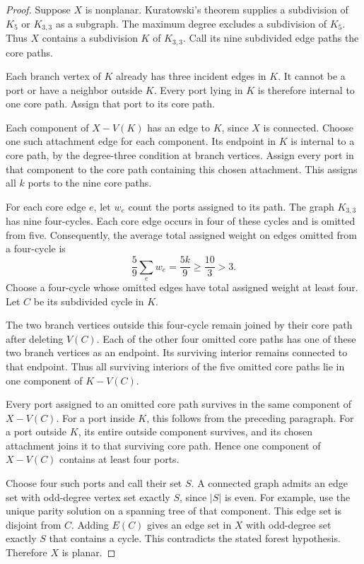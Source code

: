 \begin{proof}
Suppose $X$ is nonplanar.
Kuratowski's theorem supplies a subdivision of $K_5$ or $K_{3,3}$ as a subgraph.
The maximum degree excludes a subdivision of $K_5$.
Thus $X$ contains a subdivision $K$ of $K_{3,3}$.
Call its nine subdivided edge paths the core paths.

Each branch vertex of $K$ already has three incident edges in $K$.
It cannot be a port or have a neighbor outside $K$.
Every port lying in $K$ is therefore internal to one core path.
Assign that port to its core path.

Each component of $X-V(K)$ has an edge to $K$, since $X$ is connected.
Choose one such attachment edge for each component.
Its endpoint in $K$ is internal to a core path, by the degree-three condition at branch vertices.
Assign every port in that component to the core path containing this chosen attachment.
This assigns all $k$ ports to the nine core paths.

For each core edge $e$, let $w_e$ count the ports assigned to its path.
The graph $K_{3,3}$ has nine four-cycles.
Each core edge occurs in four of these cycles and is omitted from five.
Consequently, the average total assigned weight on edges omitted from a four-cycle is
\[
 \frac59\sum_e w_e=\frac{5k}{9}\ge\frac{10}{3}>3.
\]
Choose a four-cycle whose omitted edges have total assigned weight at least four.
Let $C$ be its subdivided cycle in $K$.

The two branch vertices outside this four-cycle remain joined by their core path after deleting $V(C)$.
Each of the other four omitted core paths has one of these two branch vertices as an endpoint.
Its surviving interior remains connected to that endpoint.
Thus all surviving interiors of the five omitted core paths lie in one component of $K-V(C)$.

Every port assigned to an omitted core path survives in the same component of $X-V(C)$.
For a port inside $K$, this follows from the preceding paragraph.
For a port outside $K$, its entire outside component survives, and its chosen attachment joins it to that surviving core path.
Hence one component of $X-V(C)$ contains at least four ports.

Choose four such ports and call their set $S$.
A connected graph admits an edge set with odd-degree vertex set exactly $S$, since $|S|$ is even.
For example, use the unique parity solution on a spanning tree of that component.
This edge set is disjoint from $C$.
Adding $E(C)$ gives an edge set in $X$ with odd-degree set exactly $S$ that contains a cycle.
This contradicts the stated forest hypothesis.
Therefore $X$ is planar.
\end{proof}

